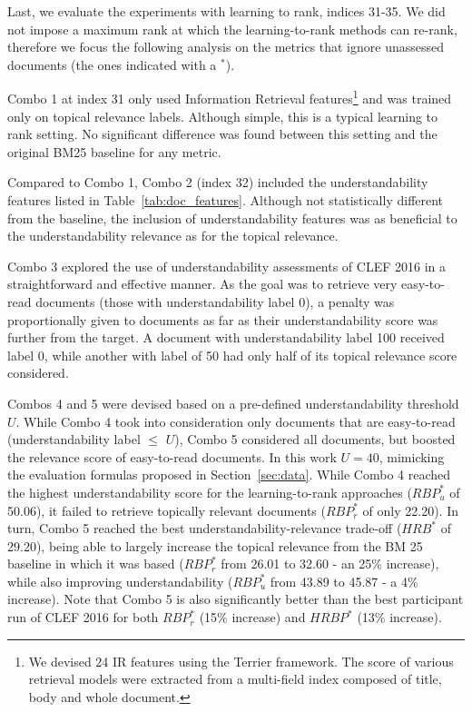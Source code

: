 Last, we evaluate the experiments with learning to rank, indices 31-35. We did not impose a maximum rank at which the learning-to-rank methods can re-rank, therefore we focus the following analysis on the metrics that ignore unassessed documents (the ones indicated with a $^*$).

Combo 1 at index 31 only used Information Retrieval features\footnote{We devised 24 IR features using the Terrier framework. The score of various retrieval models were extracted from a multi-field index composed of title, body and whole document.} and was trained only on topical relevance labels. Although simple, this is a typical learning to rank setting.
No significant difference was found between this setting and the original BM25 baseline for any metric.

Compared to Combo 1, Combo 2 (index 32) included the understandability features listed in Table~\ref{tab:doc_features}. Although not statistically different from the baseline, the inclusion of understandability features was as beneficial to the understandability relevance as for the topical relevance.

Combo 3 explored the use of understandability assessments of CLEF 2016 in a straightforward and effective manner. As the goal was to retrieve very easy-to-read documents (those with understandability label 0), a penalty was proportionally given to documents as far as their understandability score was further from the target. A document with understandability label 100 received label 0, while another with label of 50 had only half of its topical relevance score considered.

Combos 4 and 5 were devised based on a pre-defined understandability threshold $U$. While Combo 4 took into consideration only documents that are easy-to-read (understandability label $\le$ $U$), Combo 5 considered all documents, but boosted the relevance score of easy-to-read documents. In this work $U=40$, mimicking the evaluation formulas proposed in Section~\ref{sec:data}. While Combo 4 reached the highest understandability score for the learning-to-rank approaches ($RBP_u^{*}$ of 50.06), it failed to retrieve topically relevant documents ($RBP_r^{*}$ of only 22.20). In turn, Combo 5 reached the best understandability-relevance trade-off ($HRB^{*}$ of 29.20), being able to largely increase the topical relevance from the BM 25 baseline in which it was based ($RBP_r^*$ from 26.01 to 32.60 - an 25\% increase), while also improving understandability ($RBP_u^*$ from 43.89 to 45.87 - a 4\% increase). Note that Combo 5 is also significantly better than the best participant run of
CLEF 2016 for both $RBP_r^{*}$ (15\% increase) and $HRBP^{*}$ (13\% increase).


